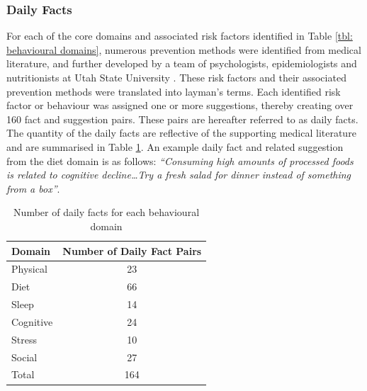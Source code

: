 \subsubsection{Daily Facts}
For each of the core domains and associated risk factors identified in Table \ref{tbl: behavioural domains},  numerous prevention methods were identified from medical literature, and further developed by a team of psychologists, epidemiologists and nutritionists at Utah State University \cite{Norton2015-TRCI}. These risk factors and their associated prevention methods were translated into layman's terms. Each identified risk factor or behaviour was assigned one or more suggestions, thereby creating over 160 fact and suggestion pairs. These pairs are hereafter referred to as daily facts. The quantity of the daily facts are reflective of the supporting medical literature and are summarised in Table \ref{tbl: daily fact count}. An example daily fact and related suggestion from the diet domain is as follows: \textit{“Consuming high amounts of processed foods is related to cognitive decline\ldots Try a fresh salad for dinner instead of something from a box”}.
\begin{table}
\centering
\caption{Number of daily facts for each behavioural domain}
\label{tbl: daily fact count}
\begin{tabular}{@{}l c@{}}
\toprule
Domain    & Number of Daily Fact Pairs \\ 	\midrule
Physical  & 23                              \\
Diet      & 66                              \\
Sleep     & 14                              \\
Cognitive & 24                              \\
Stress    & 10                             	\\
Social    & 27                              \\ \hline \hline
Total	  & 164								\\	\bottomrule
\end{tabular}
\end{table}

